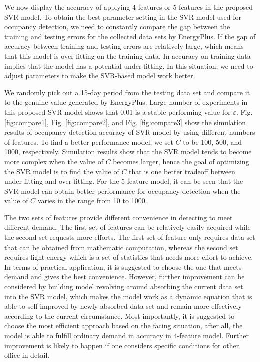 We now display the accuracy of applying 4 features or 5 features in the
proposed SVR model. To obtain the best parameter setting in the SVR model used
for occupancy detection, we need to constantly compare the gap between the
training and testing errors for the collected data sets by EnergyPlus. If the
gap of accuracy between training and testing errors are relatively large, which
means that this model is over-fitting on the training data. In accuracy on
training data implies that the model has a potential under-fitting. In this
situation, we need to adjust parameters to make the SVR-based model work
better.

We randomly pick out a 15-day period from the testing data set and compare it
to the genuine value generated by EnergyPlus. Large number of experiments in
this proposed SVR model shows that 0.01 is a stable-performing value for
$\varepsilon$. Fig. \ref{fig:compare1}, Fig. \ref{fig:compare2}, and Fig.
\ref{fig:compare3} show the simulation results of occupancy detection accuracy
of SVR model by using different numbers of features. To find a better
performance model, we set $C$ to be 100, 500, and 1000, respectively.
Simulation results show that the SVR model tends to become more complex when
the value of $C$ becomes larger, hence the goal of optimizing the SVR model is
to find the value of $C$ that is one better tradeoff between under-fitting and
over-fitting. For the 5-feature model, it can be seen that the SVR model can
obtain better performance for occupancy detection when the value of $C$ varies
in the range from 10 to 1000.

The two sets of features provide different convenience in detecting to meet
different demand. The first set of features  can be relatively easily acquired
while the second set requests more efforts. The first set of feature only
requires data set that can be obtained from mathematic computation, whereas the
second set  requires light energy which is a set of statistics that needs more
effort to achieve. In terms of practical application, it is suggested to choose
the one that meets demand and gives the best convenience. However, further
improvement can be considered by building model revolving around absorbing the
current data set into the SVR model, which makes the model work as a dynamic
equation that is able to self-improved by newly absorbed data set and remain
more effectively according to the current circumstance. Most importantly, it is
suggested to choose the most efficient approach based on the facing situation,
after all, the model is able to fulfill ordinary demand in accuracy in
4-feature model. Further improvement is likely to happen if one considers
specific conditions for other office in detail.

